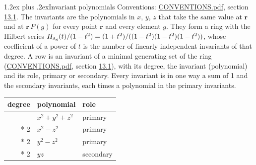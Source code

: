 \documentclass[10pt,a4paper]{article}
\makeatletter
\renewcommand\section{\@startsection{section}{1}{\z@}{-3ex plus -1ex minus -.2ex}%
  {1.2ex plus .2ex}{\normalfont\large\sffamily\bfseries\color{parttitle}}}
\numberwithin{equation}{section}
\newcommand{\irr}[1]{\text{\normalfont\scshape #1}}
\newcommand{\ptag}[1]{\mathrm{#1}}
\newcommand{\pointr}{\mathbf{r}}
\makeatother
\begin{document}
\section{Invariant polynomials}\label{s:invariant_polynomials}
Conventions: \href{../../CONVENTIONS.pdf}{CONVENTIONS.pdf}, section \href{../../CONVENTIONS.pdf\#conv.13.1}{13.1}.
The invariants are the polynomials in $x$, $y$, $z$ that take the same value at $\pointr$ and at $\pointr\,P(g)$ for every point $\pointr$ and every element $g$. They form a ring with the Hilbert series $H_{\irr{a}_{\ptag{g}}}(t)/(1-t^{2}) = (1 + t^{2})/((1-t^{2})(1-t^{2})(1-t^{2}))$, whose coefficient of a power of $t$ is the number of linearly independent invariants of that degree. \label{n:head.degree}\label{n:head.role}A row is an invariant of a minimal generating set of the ring (\href{../../CONVENTIONS.pdf}{CONVENTIONS.pdf}, section \href{../../CONVENTIONS.pdf\#conv.13.1}{13.1}), with its degree, the invariant (polynomial) and its role, primary or secondary. Every invariant is in one way a sum of 1 and the secondary invariants, each times a polynomial in the primary invariants.
{\small\begin{longtable}{@{}rll@{}}\toprule
degree & polynomial & role\\\midrule\endhead
\bottomrule\endfoot\endlastfoot
2 & $x^{2} + y^{2} + z^{2}$ & primary\\*
2 & $x^{2} - z^{2}$ & primary\\*
2 & $y^{2} - z^{2}$ & primary\\*
2 & $yz$ & secondary\\
\bottomrule\end{longtable}}
\end{document}

